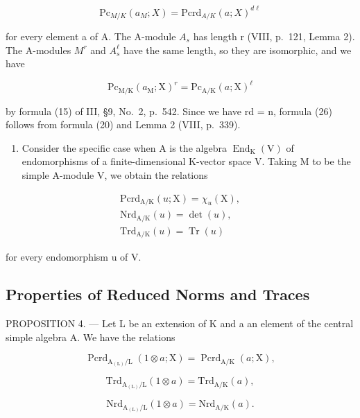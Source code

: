 \[
\mathrm{Pc} _ {M / K} (a_ {M} ;X) = \mathrm{Pcrd} _ {A / K} (a; X) ^ {d\ell}\tag{26}
\]

for every element a of A. The A-module \(A_{s}\) has length r (VIII, p.~121, Lemma 2). The A-modules \(M^{r}\) and \(A_{s}^{\ell}\) have the same length, so they are isomorphic, and we have

\[
\mathrm{Pc} _ {\mathrm{M/K}} (a _ {\mathrm{M}}; \mathrm{X}) ^ {r} = \mathrm{Pc} _ {\mathrm{A/K}} (a; \mathrm{X}) ^ {\ell}
\]

by formula (15) of III, §9, No.~2, p.~542. Since we have rd = n, formula (26) follows from formula (20) and Lemma 2 (VIII, p.~339).

\begin{enumerate}
\def\labelenumi{\arabic{enumi})}
\setcounter{enumi}{1}
\tightlist
\item
  Consider the specific case when A is the algebra \(\operatorname{End}_{\mathrm{K}}(\mathrm{V})\) of endomorphisms of a finite-dimensional K-vector space V. Taking M to be the simple A-module V, we obtain the relations
\end{enumerate}

\[
\begin{array}{c} \mathrm{Pcrd} _ {\mathrm{A/K}} (u; \mathrm{X}) = \chi_ {u} (\mathrm{X}), \\ \mathrm{Nrd} _ {\mathrm{A/K}} (u) = \det (u), \\ \mathrm{Trd} _ {\mathrm{A/K}} (u) = \operatorname{Tr} (u) \end{array}\tag{27}
\]

for every endomorphism u of V.

\subsection{Properties of Reduced Norms and Traces}

PROPOSITION 4. --- Let L be an extension of K and a an element of the central simple algebra A. We have the relations

\[
\operatorname{Pcrd} _ {\mathrm{A} _ {(\mathrm{L})} / \mathrm{L}} (1 \otimes a; \mathrm{X}) = \operatorname{Pcrd} _ {\mathrm{A} / \mathrm{K}} (a; \mathrm{X}),\tag{28}
\]

\[
\mathrm{Trd} _ {\mathrm{A} _ {(\mathrm{L})} / \mathrm{L}} (1 \otimes a) = \mathrm{Trd} _ {\mathrm{A} / \mathrm{K}} (a),\tag{29}
\]

\[
\mathrm{Nrd} _ {\mathrm{A} _ {(\mathrm{L})} / \mathrm{L}} (1 \otimes a) = \mathrm{Nrd} _ {\mathrm{A} / \mathrm{K}} (a).\tag{30}
\]

